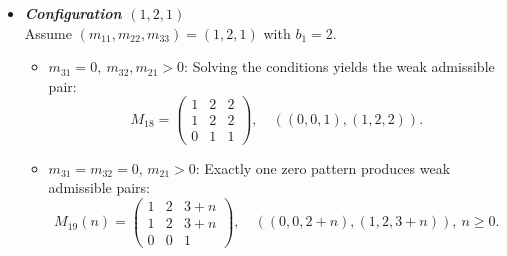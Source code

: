 \documentclass[12pt,reqno]{amsart}
\theoremstyle{plain}
\theoremstyle{definition}
\theoremstyle{remark}
\theoremstyle{definition}
\begin{document}
\begin{itemize}
$$
M_{14}(n)=\left( \begin{array}{ccc}
1 & 1 & 3+n\\
1 & 1 & 3+n \\
0 & 0 & 2
\end{array}
\right),
\quad
((0,0,1+n),(1, 1, 3+n)),\ n\geq 0.
$$ 

$$
M_{15}(n)=\left( \begin{array}{ccc}
1 & 2+n & 3+n\\
0 & 1 & 2 \\
0 & 1 & 2
\end{array}
\right),
\quad 
((0,1+n, 1+n),(1, 2+n, 3+n)),\ n\geq 0.
$$

$$
M_{16}(n)=\left( \begin{array}{ccc}
1 & 2 & 4+n\\
0 & 1 & 3+n \\
0 & 0 & 2
\end{array}
\right),
\quad
((0,1, 2+n),(1, 2, 4+n)),\ n\geq 0.
$$

$$
M_{17}(m,n)=\left( \begin{array}{ccc}
1 & 1+m & 3+n\\
0 & 1 & 3+n-m \\
0 & 0 & 2
\end{array}
\right),
\quad
((0, m, 1+n),(1, 1+m, 3+n)),\ 1 \leq m<n.
$$


\item \textit{\textbf{Configuration $(1, 2, 1)$}} \\
Assume $(m_{11}, m_{22}, m_{33}) = (1, 2, 1)$ with $b_1 = 2$.

\begin{itemize}
    \item \textbf{$m_{31}= 0,\ m_{32},m_{21} > 0$}: Solving the conditions yields the weak admissible pair:
    \[
    M_{18} = \begin{pmatrix}1 & 2 & 2\\
1 & 2 & 2 \\
0 & 1 & 1 \end{pmatrix},\quad ((0,0,1),(1,2, 2)).
    \]

    \item \textbf{$m_{31} = m_{32} = 0,\, m_{21}>0$}: Exactly one zero pattern produces weak admissible pairs:
    \[
    M_{19}(n) = \begin{pmatrix}1 & 2 & 3+n\\
1 & 2 & 3+n \\
0 & 0 & 1\end{pmatrix},\quad ((0,0, 2+n),(1, 2, 3+n)),\ n\geq 0.
    \]


\end{itemize}
\end{itemize}
\end{document}
